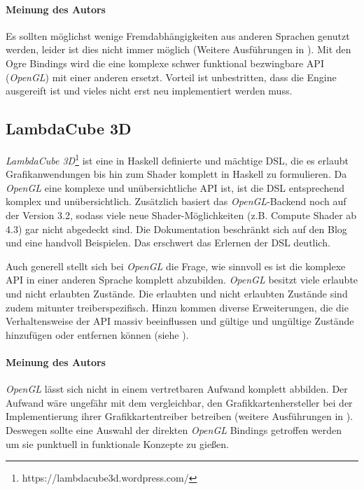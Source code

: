 \paragraph{Meinung des Autors} Es sollten möglichst wenige Fremdabhängigkeiten aus anderen Sprachen genutzt werden, leider ist dies nicht immer möglich (Weitere Ausführungen in ). Mit den Ogre Bindings wird die eine komplexe schwer funktional bezwingbare \acs{API} (\textit{OpenGL}) mit einer anderen ersetzt. Vorteil ist unbestritten, dass die Engine ausgereift ist und vieles nicht erst neu implementiert werden muss.

\subsection{LambdaCube 3D}

\textit{LambdaCube 3D}\footnote{https://lambdacube3d.wordpress.com/} ist eine in Haskell definierte und mächtige \ac{DSL}, die es erlaubt Grafikanwendungen bis hin zum Shader komplett in Haskell zu formulieren. Da \textit{OpenGL} eine komplexe und unübersichtliche \acs{API} ist, ist die \ac{DSL} entsprechend komplex und unübersichtlich. Zusätzlich basiert das \textit{OpenGL}-Backend noch auf der Version 3.2, sodass viele neue Shader-Möglichkeiten (z.B. Compute Shader ab 4.3) gar nicht abgedeckt sind. Die Dokumentation beschränkt sich auf den Blog und eine handvoll Beispielen. Das erschwert das Erlernen der DSL deutlich.

Auch generell stellt sich bei \textit{OpenGL} die Frage, wie sinnvoll es ist die komplexe \acs{API} in einer anderen Sprache komplett abzubilden. \textit{OpenGL} besitzt viele erlaubte und nicht erlaubten Zustände. Die erlaubten und nicht erlaubten Zustände sind zudem mitunter treiberspezifisch. Hinzu kommen diverse Erweiterungen, die die Verhaltensweise der \acs{API} massiv beeinflussen und gültige und ungültige Zustände hinzufügen oder entfernen können (siehe ).

\paragraph{Meinung des Autors} \textit{OpenGL} lässt sich nicht in einem vertretbaren Aufwand komplett abbilden. Der Aufwand wäre ungefähr mit dem vergleichbar, den Grafikkartenhersteller bei der Implementierung ihrer Grafikkartentreiber betreiben (weitere Ausführungen in ). Deswegen sollte eine Auswahl der direkten \textit{OpenGL} Bindings getroffen werden um sie punktuell in funktionale Konzepte zu gießen.


